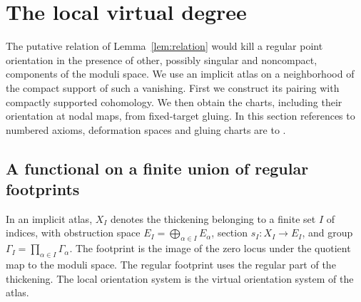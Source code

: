 \section{The local virtual degree}\label{sec:degree}

The putative relation of Lemma~\ref{lem:relation} would kill a
regular point orientation in the presence of other, possibly singular
and noncompact, components of the moduli space. We use an implicit atlas
on a neighborhood of the compact support of such a vanishing. First
we construct its pairing with compactly supported cohomology. We then
obtain the charts, including their orientation at nodal maps, from
fixed-target gluing. In this section references to numbered axioms,
deformation spaces and gluing charts are to \cite{Atlas}.

\subsection{A functional on a finite union of regular footprints}
In an implicit atlas, $X_I$ denotes the thickening belonging to a
finite set $I$ of indices, with obstruction space
$E_I=\bigoplus_{\alpha\in I}E_\alpha$, section $s_I:X_I\to E_I$,
and group $\Gamma_I=\prod_{\alpha\in I}\Gamma_\alpha$.
The footprint is the image of the zero locus under the quotient map
to the moduli space. The regular footprint uses the regular part of
the thickening. The local orientation system is the virtual
orientation system of the atlas.

